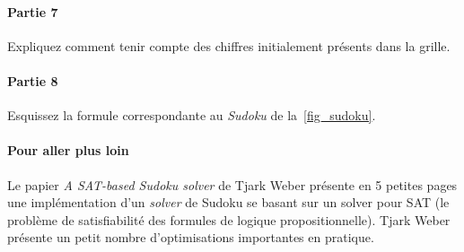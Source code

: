 \documentclass[12pt,french,a4paper]{article}
\begin{document}
\begin{question}
\paragraph{Partie 7}

Expliquez comment tenir compte des chiffres initialement présents dans la grille.

\paragraph{Partie 8}

Esquissez la formule correspondante au \textit{Sudoku} de la~\cref{fig_sudoku}.

\paragraph{Pour aller plus loin}
Le papier \textit{A SAT-based Sudoku solver} de Tjark Weber présente en 5 petites pages une implémentation d'un \textit{solver} de Sudoku se basant sur un solver pour SAT (le problème de satisfiabilité des formules de logique propositionnelle).
Tjark Weber présente un petit nombre d'optimisations importantes en pratique.

\end{question}
\end{document}
